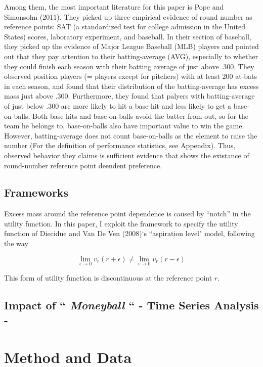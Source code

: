 \documentclass[dvipdfmx, 12pt]{article}
\begin{document}
  Among them, the most important literature for this paper is Pope and
  Simonsohn (2011). They picked up three empirical evidence of round number
  as reference points: SAT (a standardized test for college admission
  in the
  United States) scores, laboratory experiment, and baseball.
  In their section of baseball, they picked up the evidence of
  Major League Baseball (MLB) players and pointed out that they pay
  attention
  to their batting-average (AVG), especially to whether they could finish
  each season with their batting average of just above .300.
  They observed position players (= players except for pitchers) with at
  least 200 at-bats in each season, and found that their distribution
  of the batting-average has excess mass just above .300.
  Furthermore, they found that palyers with batting-average of just below
  .300 are more likely to hit a base-hit and less likely to get a
  base-on-balls.
  Both base-hits and base-on-balls avoid the batter from out, so for the
  team he belongs to, base-on-balls also have important value to win the
  game. However, batting-average does not count base-on-balls as the
  element to raise the number (For the definition of performance
  statistics, see Appendix). Thus, observed behavior they claims is
  sufficient evidence that shows the existance of round-number reference
  point deendent preference.



 \subsection{Frameworks}

 Excess mass around the reference point dependence is caused by
 ``notch'' in the utility function. In this paper, I exploit the
 framework to specify the utility function of Diecidue and
 Van De Ven (2008)`s ``aspiration level" model, following the
 way

 \[
 \lim_{\epsilon \to 0} v_r (r + \epsilon) \neq
 \lim_{\epsilon \to 0} v_r (r - \epsilon)
 \]

 This form of utility function is discontinuous at the
 reference point $r$.


 \subsection{Impact of `` \textit{Moneyball} ``
 - Time Series Analysis -}


\section{Method and Data}
\end{document}

